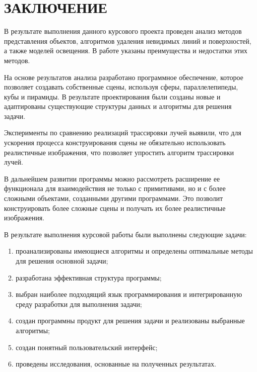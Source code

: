 \chapter*{\hfill{\centering ЗАКЛЮЧЕНИЕ}\hfill}

В результате выполнения данного курсового проекта проведен анализ методов представления объектов, алгоритмов удаления невидимых линий и поверхностей, а также моделей освещения. 
В работе указаны преимущества и недостатки этих методов.

На основе результатов анализа разработано программное обеспечение, которое позволяет создавать собственные сцены, используя сферы, параллелепипеды, кубы и пирамиды. 
В результате проектирования были созданы новые и адаптированы существующие структуры данных и алгоритмы для решения задачи.

Эксперименты по сравнению реализаций трассировки лучей выявили, что для ускорения процесса конструирования сцены не обязательно использовать реалистичные изображения, что позволяет упростить алгоритм трассировки лучей.

В дальнейшем развитии программы можно рассмотреть расширение ее функционала для взаимодействия не только с примитивами, но и с более сложными объектами, созданными другими программами. 
Это позволит конструировать более сложные сцены и получать их более реалистичные изображения.

В результате выполнения курсовой работы были выполнены следующие задачи:
\begin{enumerate}[label={\arabic*)}]
	\item проанализированы имеющиеся алгоритмы и определены оптимальные методы для решения основной задачи;
	\item разработана эффективная структура программы;
	\item выбран наиболее подходящий язык программирования и интегрированную среду разработки для выполнения задачи;
	\item создан программны продукт для решения задачи и реализованы выбранные алгоритмы;
	\item создан понятный пользовательский интерфейс;
	\item проведены исследования, основанные на полученных результатах.
\end{enumerate}
